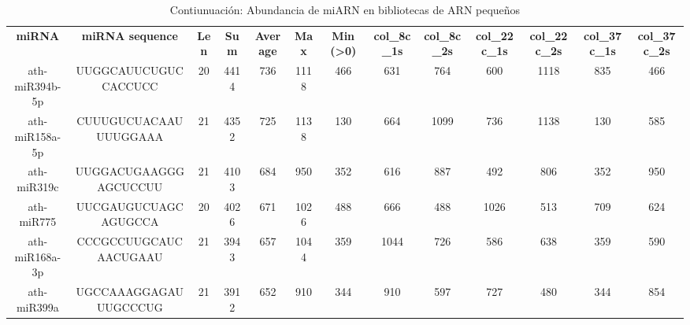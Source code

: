 \begin{landscape}
    \begin{table}[]
    \centering
    \tiny
    \caption{Contiunuación: Abundancia de miARN en bibliotecas de ARN pequeños}
    \label{table:abundancia_miARN_continuacion}
    \begin{tabular}{ccccccccccccc}
    \textbf{miRNA}   & \textbf{miRNA sequence}  & \textbf{Len} & \textbf{Sum} & \textbf{Average} & \textbf{Max} & \textbf{Min (\textgreater0)} & \textbf{col\_8c\_1s} & \textbf{col\_8c\_2s} & \textbf{col\_22c\_1s} & \textbf{col\_22c\_2s} & \textbf{col\_37c\_1s} & \textbf{col\_37c\_2s} \\
 
    ath-miR394b-5p   & UUGGCAUUCUGUCCACCUCC     & 20           & 4414         & 736              & 1118         & 466                          & 631                  & 764                  & 600                   & 1118                  & 835                   & 466                   \\
    ath-miR158a-5p   & CUUUGUCUACAAUUUUGGAAA    & 21           & 4352         & 725              & 1138         & 130                          & 664                  & 1099                 & 736                   & 1138                  & 130                   & 585                   \\
    ath-miR319c      & UUGGACUGAAGGGAGCUCCUU    & 21           & 4103         & 684              & 950          & 352                          & 616                  & 887                  & 492                   & 806                   & 352                   & 950                   \\
    ath-miR775       & UUCGAUGUCUAGCAGUGCCA     & 20           & 4026         & 671              & 1026         & 488                          & 666                  & 488                  & 1026                  & 513                   & 709                   & 624                   \\
    ath-miR168a-3p   & CCCGCCUUGCAUCAACUGAAU    & 21           & 3943         & 657              & 1044         & 359                          & 1044                 & 726                  & 586                   & 638                   & 359                   & 590                   \\
    ath-miR399a      & UGCCAAAGGAGAUUUGCCCUG    & 21           & 3912         & 652              & 910          & 344                          & 910                  & 597                  & 727                   & 480                   & 344                   & 854                   \\

\end{tabular}
\end{table}
\end{landscape}
